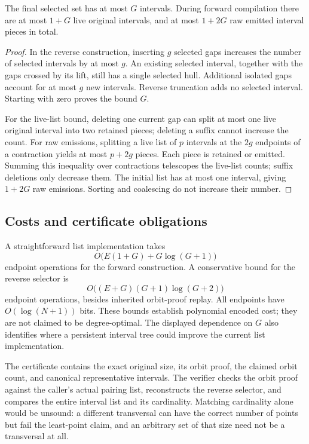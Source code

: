 \begin{lemma}
\label{lem:selector-size}
The final selected set has at most $G$ intervals. During forward compilation
there are at most $1+G$ live original intervals, and at most $1+2G$ raw
emitted interval pieces in total.
\end{lemma}
\begin{proof}
In the reverse construction, inserting $g$ selected gaps increases the
number of selected intervals by at most $g$. An existing selected interval,
together with the gaps crossed by its lift, still has a single selected
hull. Additional isolated gaps account for at most $g$ new intervals.
Reverse truncation adds no selected interval. Starting with zero proves
the bound $G$.

For the live-list bound, deleting one current gap can split at most one
live original interval into two retained pieces; deleting a suffix cannot
increase the count. For raw emissions, splitting a live list of $p$
intervals at the $2g$ endpoints of a contraction yields at most $p+2g$
pieces. Each piece is retained or emitted. Summing this inequality over
contractions telescopes the live-list counts; suffix deletions only decrease
them. The initial list has at most one interval, giving $1+2G$ raw emissions.
Sorting and coalescing do not increase their number.
\end{proof}

\subsection{Costs and certificate obligations}

A straightforward list implementation takes
\[
 O\bigl(E(1+G)+G\log(G+1)\bigr)
\]
endpoint operations for the forward construction. A conservative bound for
the reverse selector is
\[
 O\bigl((E+G)(G+1)\log(G+2)\bigr)
\]
endpoint operations, besides inherited orbit-proof replay. All endpoints
have $O(\log(N+1))$ bits. These bounds establish polynomial encoded cost;
they are not claimed to be degree-optimal. The displayed dependence on $G$
also identifies where a persistent interval tree could improve the current
list implementation.

The certificate contains the exact original size, its orbit proof, the
claimed orbit count, and canonical representative intervals. The verifier
checks the orbit proof against the caller's actual pairing list, reconstructs
the reverse selector, and compares the entire interval list and its
cardinality. Matching cardinality alone would be unsound: a different
transversal can have the correct number of points but fail the least-point
claim, and an arbitrary set of that size need not be a transversal at all.

